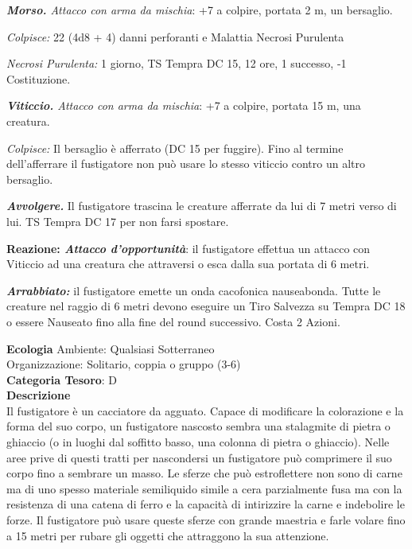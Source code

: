 \begin{multicols}{2}
{\emph{\textbf{Morso.} Attacco con arma da mischia}: +7 a colpire, portata 2 m, un bersaglio.

\emph{Colpisce:} 22 (4d8 + 4) danni perforanti e Malattia Necrosi Purulenta

\emph{Necrosi Purulenta:} 1 giorno, TS Tempra DC 15, 12 ore, 1 successo, -1 Costituzione.

\emph{\textbf{Viticcio.} Attacco con arma da mischia}: +7 a colpire, portata 15 m, una creatura.

\emph{Colpisce:} Il bersaglio è afferrato (DC 15 per fuggire). Fino al termine dell'afferrare il fustigatore non può usare lo stesso viticcio contro un altro bersaglio.

\emph{\textbf{Avvolgere.}} Il fustigatore trascina le creature afferrate da lui di 7 metri verso di lui. TS Tempra DC 17 per non farsi spostare.

\textbf{Reazione: \emph{Attacco d'opportunità}}: il fustigatore effettua un attacco con Viticcio ad una creatura che attraversi o esca dalla sua portata di 6 metri.

\emph{\textbf{Arrabbiato:}} il fustigatore emette un onda cacofonica nauseabonda. Tutte le creature nel raggio di 6 metri devono eseguire un Tiro Salvezza su Tempra DC 18 o essere Nauseato fino alla fine del round successivo. Costa 2 Azioni.

\textbf{Ecologia}
Ambiente: Qualsiasi Sotterraneo\\
Organizzazione: Solitario, coppia o gruppo (3-6)\\
\textbf{Categoria Tesoro}: D\\
\textbf{Descrizione}\\
Il fustigatore è un cacciatore da agguato. Capace di modificare la colorazione e la forma del suo corpo, un fustigatore nascosto sembra una stalagmite di pietra o ghiaccio (o in luoghi dal soffitto basso, una colonna di pietra o ghiaccio). Nelle aree prive di questi tratti per nascondersi un fustigatore può comprimere il suo corpo fino a sembrare un masso. Le sferze che può estroflettere non sono di carne ma di uno spesso materiale semiliquido simile a cera parzialmente fusa ma con la resistenza di una catena di ferro e la capacità di intirizzire la carne e indebolire le forze. Il fustigatore può usare queste sferze con grande maestria e farle volare fino a 15 metri per rubare gli oggetti che attraggono la sua attenzione.

}
\end{multicols}
